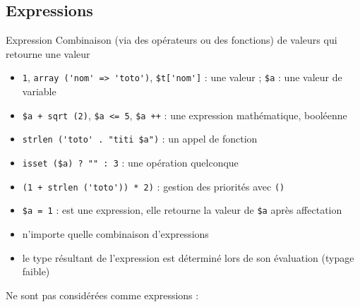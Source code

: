 \subsection{Expressions}

\begin{frame}[containsverbatim]{Expression}
Combinaison (via des opérateurs ou des fonctions) de valeurs qui retourne une valeur
\begin{itemize}
	\item \lstinline!1!, \lstinline!array ('nom' => 'toto')!, \lstinline!$t['nom']! : une valeur ; \lstinline!$a! : une valeur de variable
	\item \lstinline!$a + sqrt (2)!, \lstinline!$a <= 5!, \lstinline!$a ++! : une expression mathématique, booléenne
	\item \lstinline!strlen ('toto' . "titi $a")! : un appel de fonction
	\item \lstinline!isset ($a) ? "" : 3! : une opération quelconque
	\item \lstinline!(1 + strlen ('toto')) * 2)! : gestion des priorités avec \texttt{()}
	\item \lstinline!$a = 1! : est une expression, elle retourne la valeur de \lstinline!$a! après affectation
	\item n'importe quelle combinaison d'expressions
	\item le type résultant de l'expression est déterminé lors de son évaluation (typage faible)
\end{itemize}
Ne sont pas considérées comme expressions :
\end{frame}

